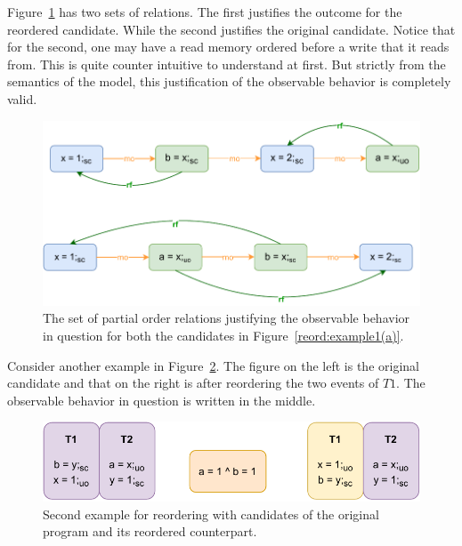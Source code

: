         Figure~\ref{reord:example1(b)} has two sets of relations. 
        The first justifies the outcome for the reordered candidate. 
        While the second justifies the original candidate. 
        Notice that for the second, one may have a read memory ordered before a write that it reads from. 
        This is quite counter intuitive to understand at first. 
        But strictly from the semantics of the model, this justification of the observable behavior is completely valid. 
        \begin{figure}[H]
            \centering
            \includegraphics[scale=0.7]{5.InstructionReordering/0.Intro/ReorderingExample1(b).pdf}
            \caption{The set of partial order relations justifying the observable behavior in question for both the candidates in Figure~\ref{reord:example1(a)}.} 
            \label{reord:example1(b)}
        \end{figure}

        
        Consider another example in Figure~\ref{reord:example2(a)}.
        The figure on the left is the original candidate and that on the right is after reordering the two events of $T1$.
        The observable behavior in question is written in the middle. 
        \begin{figure}[H]
            \centering
            \includegraphics[scale=0.7]{5.InstructionReordering/0.Intro/ReorderingExample2(a).pdf}
            \caption{Second example for reordering with candidates of the original program and its reordered counterpart.} 
            \label{reord:example2(a)}
        \end{figure}

